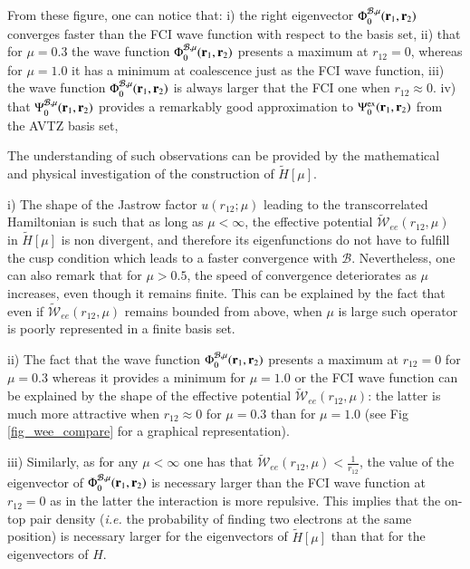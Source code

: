 \documentclass[aip,jcp,reprint,noshowkeys,superscriptaddress]{revtex4-1}
\newcommand{\br}[0]{{\bf {r}}}
\newcommand{\psiex}[0]{\Psi^{\text{ex}}_0}
\newcommand{\phimub}[0]{\Phi^{\mathcal{B},\mu}_0}
\newcommand{\psimub}[0]{\Psi^{\mathcal{B},\mu}_0}
\newcommand{\basis}[0]{\mathcal{B}}
\begin{document}
From these figure, one can notice that: 
i) the right eigenvector $\phimub(\br{}_1,\br{}_2)$ converges faster than the FCI wave function with respect to the basis set, 
ii) that for $\mu=0.3$ the wave function $\phimub(\br{}_1,\br{}_2)$ presents a maximum at $r_{12}=0$, whereas for $\mu=1.0$ it has a minimum at coalescence just as the FCI wave function, 
iii) the wave function $\phimub(\br{}_1,\br{}_2)$ is always larger that the FCI one when $r_{12}\approx 0$. 
iv) that $\psimub(\br{}_1,\br{}_2)$ provides a remarkably good approximation to $\psiex(\br{}_1,\br{}_2)$ from the AVTZ basis set, 

The understanding of such observations can be provided by the mathematical and physical investigation of the construction of $\tilde{H}[\mu]$. 

i) The shape of the Jastrow factor $u(r_{12};\mu)$ leading to the transcorrelated Hamiltonian is such that as long as $\mu < \infty$, the effective potential $\tilde{\mathcal{W}}_{ee}(r_{12},\mu)$ in $\tilde{H}[\mu]$ is non divergent, and therefore its eigenfunctions do not have to fulfill the cusp condition which leads to a faster convergence with $\basis$. 
Nevertheless, one can also remark that for $\mu > 0.5$, the speed of convergence deteriorates as $\mu$ increases, even though it remains finite. This can be explained by the fact that even if $\tilde{\mathcal{W}}_{ee}(r_{12},\mu)$ remains bounded from above, when $\mu$ is large such operator is poorly represented in a finite basis set. 

ii) The fact that the wave function $\phimub(\br{}_1,\br{}_2)$ presents a maximum at $r_{12}=0$ for $\mu=0.3$ whereas it provides a minimum for $\mu=1.0$ or the FCI wave function can be explained by the shape of the effective potential $\tilde{\mathcal{W}}_{ee}(r_{12},\mu)$: the latter is much more attractive when $r_{12}\approx 0$ for $\mu=0.3$ than for $\mu = 1.0$ (see Fig \ref{fig_wee_compare} for a graphical representation). 

iii) Similarly, as for any $\mu < \infty$ one has that $\tilde{\mathcal{W}}_{ee}(r_{12},\mu) <\frac{1}{r_{12}}$, the value of the eigenvector of $\phimub(\br{}_1,\br{}_2)$ is necessary larger than the FCI wave function at $r_{12}=0$ as in the latter the interaction is more repulsive. This implies that the on-top pair density (\textit{i.e.} the probability of finding two electrons at the same position) is necessary larger for the eigenvectors of $\tilde{H}[\mu]$ than that for the eigenvectors of $H$.
\end{document}
